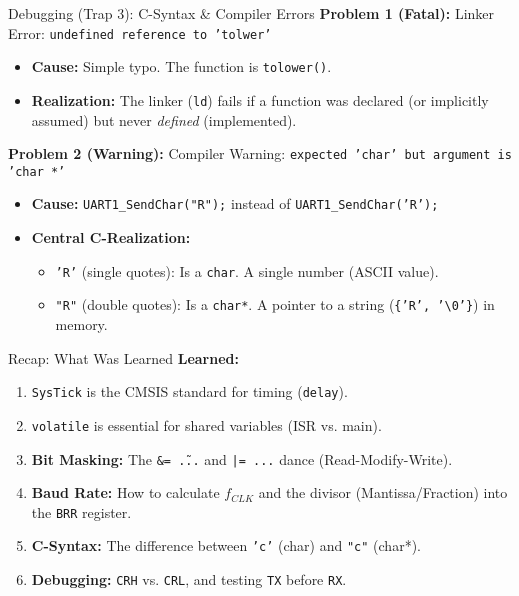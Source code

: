 \documentclass{beamer}
\begin{document}
\begin{frame}[fragile]{Debugging (Trap 3): C-Syntax \& Compiler Errors}
	\textbf{Problem 1 (Fatal):} Linker Error: \texttt{undefined reference to 'tolwer'}
	\begin{itemize}
		\item \textbf{Cause:} Simple typo. The function is \texttt{tolower()}.
		\item \textbf{Realization:} The linker (\texttt{ld}) fails if a function was declared (or implicitly assumed) but never \textit{defined} (implemented).
	\end{itemize}
	
	\bigskip
	\textbf{Problem 2 (Warning):} Compiler Warning: \texttt{expected 'char' but argument is 'char *'}
	\begin{itemize}
		\item \textbf{Cause:} \texttt{UART1\_SendChar("R");} instead of \texttt{UART1\_SendChar('R');}
		\item \textbf{Central C-Realization:}
		\begin{itemize}
			\item \texttt{'R'} (single quotes): Is a \texttt{char}. A single number (ASCII value).
			\item \texttt{"R"} (double quotes): Is a \texttt{char*}. A pointer to a string (\texttt{\{'R', '\textbackslash{}0'\}}) in memory.
		\end{itemize}
		\end{itemize}
		\end{frame}
		
		\begin{frame}{Recap: What Was Learned}
			\textbf{Learned:}
			\begin{enumerate}
				\item \texttt{SysTick} is the CMSIS standard for timing (\texttt{delay}).
				\item \texttt{volatile} is essential for shared variables (ISR vs. main).
				\item \textbf{Bit Masking:} The \texttt{\&= \~...} and \texttt{|= ...} dance (Read-Modify-Write).
				\item \textbf{Baud Rate:} How to calculate $f_{CLK}$ and the divisor (Mantissa/Fraction) into the \texttt{BRR} register.
				\item \textbf{C-Syntax:} The difference between \texttt{'c'} (char) and \texttt{"c"} (char*).
				\item \textbf{Debugging:} \texttt{CRH} vs. \texttt{CRL}, and testing \texttt{TX} before \texttt{RX}.
			\end{enumerate}
		\end{frame}
		
\end{document}
